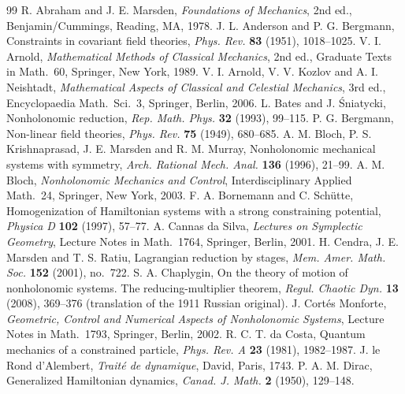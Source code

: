 \documentclass[11pt,a4paper]{article}
\numberwithin{equation}{section}
\theoremstyle{plain}
\theoremstyle{definition}
\theoremstyle{remark}
\begin{document}
\begin{thebibliography}{99}
\small
{} R. Abraham and J. E. Marsden, \emph{Foundations of Mechanics}, 2nd ed., Benjamin/Cummings, Reading, MA, 1978.
 J. L. Anderson and P. G. Bergmann, Constraints in covariant field theories, \emph{Phys. Rev.} \textbf{83} (1951), 1018--1025.
 V. I. Arnold, \emph{Mathematical Methods of Classical Mechanics}, 2nd ed., Graduate Texts in Math.\ 60, Springer, New York, 1989.
 V. I. Arnold, V. V. Kozlov and A. I. Neishtadt, \emph{Mathematical Aspects of Classical and Celestial Mechanics}, 3rd ed., Encyclopaedia Math.\ Sci.\ 3, Springer, Berlin, 2006.
 L. Bates and J. \'Sniatycki, Nonholonomic reduction, \emph{Rep. Math. Phys.} \textbf{32} (1993), 99--115.
 P. G. Bergmann, Non-linear field theories, \emph{Phys. Rev.} \textbf{75} (1949), 680--685.
 A. M. Bloch, P. S. Krishnaprasad, J. E. Marsden and R. M. Murray, Nonholonomic mechanical systems with symmetry, \emph{Arch. Rational Mech. Anal.} \textbf{136} (1996), 21--99.
 A. M. Bloch, \emph{Nonholonomic Mechanics and Control}, Interdisciplinary Applied Math.\ 24, Springer, New York, 2003.
 F. A. Bornemann and C. Sch\"utte, Homogenization of Hamiltonian systems with a strong constraining potential, \emph{Physica D} \textbf{102} (1997), 57--77.
 A. Cannas da Silva, \emph{Lectures on Symplectic Geometry}, Lecture Notes in Math.\ 1764, Springer, Berlin, 2001.
 H. Cendra, J. E. Marsden and T. S. Ratiu, Lagrangian reduction by stages, \emph{Mem. Amer. Math. Soc.} \textbf{152} (2001), no.~722.
 S. A. Chaplygin, On the theory of motion of nonholonomic systems. The reducing-multiplier theorem, \emph{Regul. Chaotic Dyn.} \textbf{13} (2008), 369--376 (translation of the 1911 Russian original).
 J. Cort\'es Monforte, \emph{Geometric, Control and Numerical Aspects of Nonholonomic Systems}, Lecture Notes in Math.\ 1793, Springer, Berlin, 2002.
 R. C. T. da Costa, Quantum mechanics of a constrained particle, \emph{Phys. Rev. A} \textbf{23} (1981), 1982--1987.
 J. le Rond d'Alembert, \emph{Trait\'e de dynamique}, David, Paris, 1743.
 P. A. M. Dirac, Generalized Hamiltonian dynamics, \emph{Canad. J. Math.} \textbf{2} (1950), 129--148.

\end{thebibliography}
\end{document}
